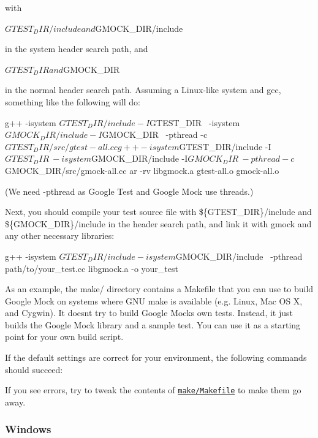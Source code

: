 with \begin{DoxyVerb}${GTEST_DIR}/include and ${GMOCK_DIR}/include
\end{DoxyVerb}


in the system header search path, and \begin{DoxyVerb}${GTEST_DIR} and ${GMOCK_DIR}
\end{DoxyVerb}


in the normal header search path. Assuming a Linux-\/like system and gcc, something like the following will do\+: \begin{DoxyVerb}g++ -isystem ${GTEST_DIR}/include -I${GTEST_DIR} \
    -isystem ${GMOCK_DIR}/include -I${GMOCK_DIR} \
    -pthread -c ${GTEST_DIR}/src/gtest-all.cc
g++ -isystem ${GTEST_DIR}/include -I${GTEST_DIR} \
    -isystem ${GMOCK_DIR}/include -I${GMOCK_DIR} \
    -pthread -c ${GMOCK_DIR}/src/gmock-all.cc
ar -rv libgmock.a gtest-all.o gmock-all.o
\end{DoxyVerb}


(We need -\/pthread as Google Test and Google Mock use threads.)

Next, you should compile your test source file with \$\{G\+T\+E\+S\+T\+\_\+\+D\+IR\}/include and \$\{G\+M\+O\+C\+K\+\_\+\+D\+IR\}/include in the header search path, and link it with gmock and any other necessary libraries\+: \begin{DoxyVerb}g++ -isystem ${GTEST_DIR}/include -isystem ${GMOCK_DIR}/include \
    -pthread path/to/your_test.cc libgmock.a -o your_test
\end{DoxyVerb}


As an example, the make/ directory contains a Makefile that you can use to build Google Mock on systems where G\+NU make is available (e.\+g. Linux, Mac OS X, and Cygwin). It doesn\textquotesingle{}t try to build Google Mock\textquotesingle{}s own tests. Instead, it just builds the Google Mock library and a sample test. You can use it as a starting point for your own build script.

If the default settings are correct for your environment, the following commands should succeed\+: 


If you see errors, try to tweak the contents of \href{make/Makefile}{\tt make/\+Makefile} to make them go away.

\subsubsection*{Windows}

